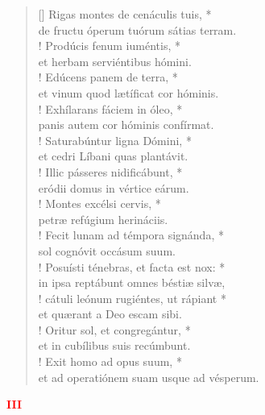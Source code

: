 \begin{verse}[\versewidth]
Rigas montes de cenáculis tuis, *\\
de fructu óperum tuórum sátias terram.\\!
\vin Prodúcis fenum iuméntis, *\\
\vin et herbam serviéntibus hómini.\\!
Edúcens panem de terra, *\\
et vinum quod lætíficat cor hóminis.\\!
\vin Exhílarans fáciem in óleo, *\\
\vin panis autem cor hóminis confírmat.\\!
Saturabúntur ligna Dómini, *\\
et cedri Líbani quas plantávit.\\!
\vin Illic pásseres nidificábunt, *\\
\vin eródii domus in vértice eárum.\\!
Montes excélsi cervis, *\\
petræ refúgium herináciis.\\!
\vin Fecit lunam ad témpora signánda, *\\
\vin sol cognóvit occásum suum.\\!
Posuísti ténebras, et facta est nox: *\\
in ipsa reptábunt omnes béstiæ silvæ,\\!
\vin cátuli leónum rugiéntes, ut rápiant *\\
\vin et quærant a Deo escam sibi.\\!
Oritur sol, et congregántur, *\\
et in cubílibus suis recúmbunt.\\!
\vin Exit homo ad opus suum, *\\
\vin et ad operatiónem suam usque ad vésperum.\\
\end{verse}
\begin{center}
\textcolor{red}{\bf III}
\end{center}
